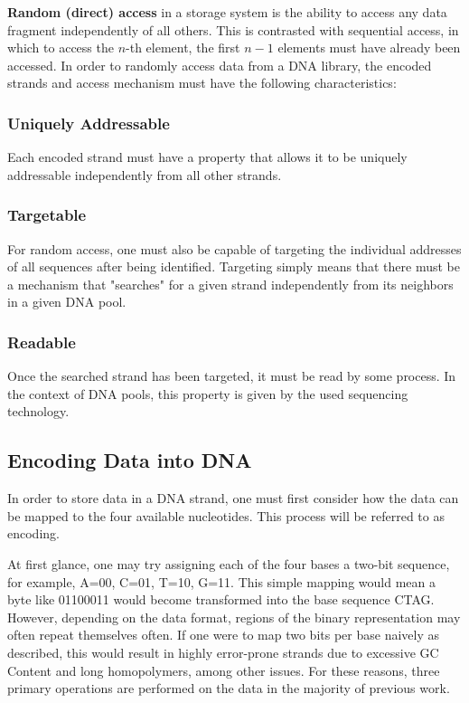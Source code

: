 \documentclass[a4paper,conference]{IEEEtran}
\begin{document}
\textbf{Random (direct) access} in a storage system is the ability to access any data fragment independently of all others. This is contrasted with sequential access, in which to access the $n$-th element, the first $n-1$ elements must have already been accessed. In order to randomly access data from a DNA library, the encoded strands and access mechanism must have the following characteristics: \\

\subsubsection{Uniquely Addressable}
Each encoded strand must have a property that allows it to be uniquely addressable independently from all other strands. \\

\subsubsection{Targetable}
For random access, one must also be capable of targeting the individual addresses of all sequences after being identified. Targeting simply means that there must be a mechanism that "searches" for a given strand independently from its neighbors in a given DNA pool. \\ 

\subsubsection{Readable}
Once the searched strand has been targeted, it must be read by some process. In the context of DNA pools, this property is given by the used sequencing technology. \\




\subsection{Encoding Data into DNA}
In order to store data in a DNA strand, one must first consider how the data can be mapped to the four available nucleotides. This process will be referred to as encoding.

At first glance, one may try assigning each of the four bases a two-bit sequence, for example, A=00, C=01, T=10, G=11. This simple mapping would mean a byte like 01100011 would become transformed into the base sequence CTAG. However, depending on the data format, regions of the binary representation may often repeat themselves often. If one were to map two bits per base naively as described, this would result in highly error-prone strands due to excessive GC Content and long homopolymers, among other issues. For these reasons, three primary operations are performed on the data in the majority of previous work.
\end{document}
